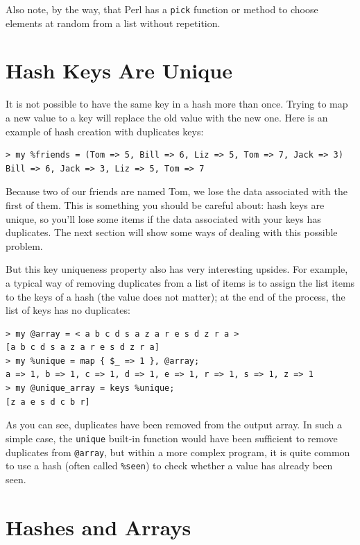 Also note, by the way, that Perl has a {\tt pick} function or 
method to choose elements at random from a list without 
repetition.


\section{Hash Keys Are Unique}

It is not possible to have the same key in a hash more than once. 
Trying to map a new value to a key will replace the old 
value with the new one. Here is an example of hash creation 
with duplicates keys:

\begin{verbatim}
> my %friends = (Tom => 5, Bill => 6, Liz => 5, Tom => 7, Jack => 3)
Bill => 6, Jack => 3, Liz => 5, Tom => 7
\end{verbatim}

Because two of our friends are named Tom, we lose the data 
associated with the first of them. This is something you should 
be careful about: hash keys are unique, so you'll lose some items  
if the data associated with your keys has duplicates. The 
next section will show some ways of dealing with this 
possible problem.

But this key uniqueness property also has very interesting upsides. 
For example, a typical way of removing duplicates from a list of 
items is to assign the list items to the keys of a hash (the 
value does not matter); at the end of the process, the list of 
keys has no duplicates:

\begin{verbatim}
> my @array = < a b c d s a z a r e s d z r a >
[a b c d s a z a r e s d z r a]
> my %unique = map { $_ => 1 }, @array;
a => 1, b => 1, c => 1, d => 1, e => 1, r => 1, s => 1, z => 1
> my @unique_array = keys %unique;
[z a e s d c b r]
\end{verbatim}

As you can see, duplicates have been removed from the output 
array. In such a simple case, the {\tt unique} built-in function 
would have been sufficient to remove duplicates from 
\verb'@array', but within a more complex program, 
it is quite common to use a hash (often called \verb'%seen') 
to check whether a value has already been seen.

\section{Hashes and Arrays}
\label{invert}


